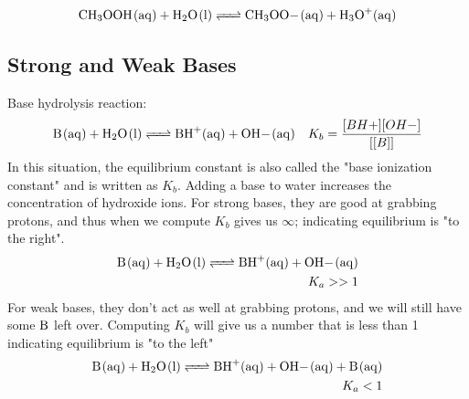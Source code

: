 \documentclass{article}  %
\begin{document}
\begin{equation*}
    \begin{aligned}
        \ce{CH3OOH_(aq) + H2O_(l) <=> CH3OO-_(aq) + H3O+_(aq)}
    \end{aligned}
\end{equation*}

\subsection*{Strong and Weak Bases}
Base hydrolysis reaction:
\begin{equation*}
    \begin{aligned}
        \ce{B_(aq) + H2O_(l) <=> BH+_(aq) + OH-_(aq)} \quad K_b = \frac{[BH+][OH-]}{[[B]]}
    \end{aligned}
\end{equation*}
In this situation, the equilibrium constant is also called the "base ionization constant" and is written as $K_b$.
\newline
Adding a base to water increases the concentration of hydroxide ions.
\newline
For strong bases, they are good at grabbing protons, and thus when we compute $K_b$ gives us $\infty$; indicating equilibrium is "to the right".
\begin{equation*}
    \begin{aligned}
        \ce{B_(aq) + H2O_(l) <=> BH+_(aq) + OH-_(aq)} \\
        K_a >> 1
    \end{aligned}
\end{equation*}
For weak bases, they don't act as well at grabbing protons, and we will still have some $\ce{B}$ left over. Computing $K_b$ will give us a number that is less than 1 indicating equilibrium is "to the left"
\begin{equation*}
    \begin{aligned}
        \ce{B_(aq) + H2O_(l) <=> BH+_(aq) + OH-_(aq) + B_(aq)} \\
        K_a < 1
    \end{aligned}
\end{equation*}

\end{document}
